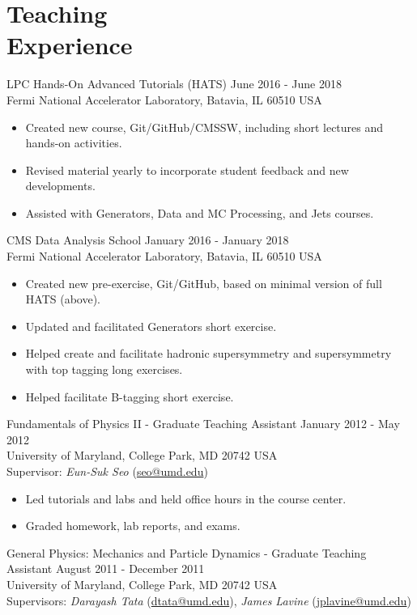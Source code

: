\section{Teaching\\Experience}
LPC Hands-On Advanced Tutorials (HATS) \hfill June 2016 - June 2018\\
Fermi National Accelerator Laboratory, Batavia, IL 60510 USA
\begin{itemize}[leftmargin=12pt]
\item Created new course, Git/GitHub/CMSSW, including short lectures and hands-on activities.
\item Revised material yearly to incorporate student feedback and new developments.
\item Assisted with Generators, Data and MC Processing, and Jets courses.
\end{itemize}
CMS Data Analysis School \hfill January 2016 - January 2018\\
Fermi National Accelerator Laboratory, Batavia, IL 60510 USA
\begin{itemize}[leftmargin=12pt]
\item Created new pre-exercise, Git/GitHub, based on minimal version of full HATS (above).
\item Updated and facilitated Generators short exercise.
\item Helped create and facilitate hadronic supersymmetry and supersymmetry with top tagging long exercises.
\item Helped facilitate B-tagging short exercise.
\end{itemize}
Fundamentals of Physics II - Graduate Teaching Assistant \hfill January 2012 - May 2012\\
University of Maryland, College Park, MD 20742 USA\\
Supervisor: {\sl Eun-Suk Seo} (\href{mailto:seo@umd.edu}{seo@umd.edu})
\begin{itemize}[leftmargin=12pt]
\item Led tutorials and labs and held office hours in the course center.
\item Graded homework, lab reports, and exams.
\end{itemize}
General Physics: Mechanics and Particle Dynamics - Graduate Teaching Assistant \hfill August 2011 - December 2011\\
University of Maryland, College Park, MD 20742 USA\\
Supervisors: {\sl Darayash Tata} (\href{mailto:dtata@umd.edu}{dtata@umd.edu}), {\sl James Lavine} (\href{mailto:jplavine@umd.edu}{jplavine@umd.edu})
